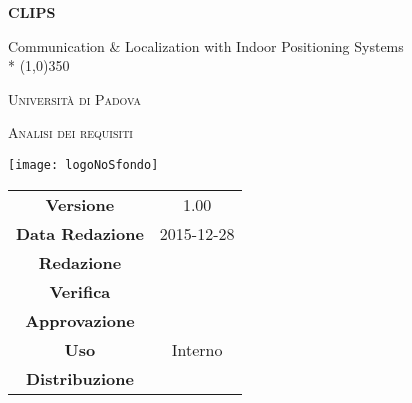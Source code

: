 \documentclass[a4paper,12pt]{article}
\author{Oscar Elia Conti, Marco Zanella}
\date{24/12/2015}
\begin{document}
	\begin{titlepage}
		\centering
		{\huge\bfseries CLIPS\par}
		Communication \& Localization with Indoor Positioning Systems \\*
		\line(1,0){350} \\
		{\scshape\LARGE Università di Padova \par}
		\vspace{1cm}
		{\scshape\Large Analisi dei requisiti\par}
		\vspace{2cm}
		\begin{center}
		{\texttt{[image: logoNoSfondo]} \par}
		\end{center}
		\vfill \vfill
		\begin{tabular}{c|c}
			{\hfill \textbf{Versione}} 			& 1.00			\\
			{\hfill\textbf{Data Redazione}} 		& 2015-12-28  		\\ 
			{\hfill\textbf{Redazione}} 			&      \\
			{\hfill\textbf{Verifica}} 				&  \\ 
			{\hfill\textbf{Approvazione}} 		&  \\
			{\hfill\textbf{Uso}} 					& Interno			\\
			{\hfill\textbf{Distribuzione}} 			& \leaf			\\
		\end{tabular}
	\end{titlepage}
	\newpage
	
	
	\newpage
	\label{LastFrontPage}
	\newpage
	\pagestyle{mymain}
         
         	\newpage
		
	

		
	\label{LastPage}
\end{document}
